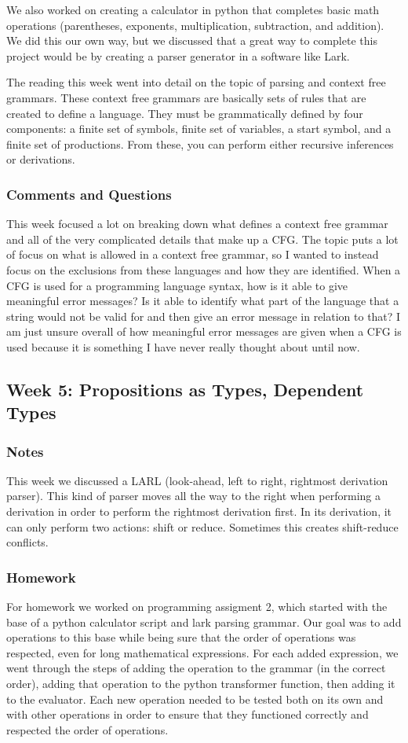\documentclass{article}
\theoremstyle{theorem}
\theoremstyle{definition}
\theoremstyle{remark}
\begin{document}
We also worked on creating a calculator in python that completes basic math 
operations (parentheses, exponents, multiplication, subtraction, and addition). 
We did this our own way, but we discussed that a great way to complete this project would be 
by creating a parser generator in a software like Lark. 

The reading this week went into detail on the topic of parsing and context free grammars. These context 
free grammars are basically sets of rules that are created to define a language. They must be grammatically 
defined by four components: a finite set of symbols, finite set of variables, a start symbol, and a finite set of
productions. From these, you can perform either recursive inferences or derivations. 
\subsubsection*{Comments and Questions}
This week focused a lot on breaking down what defines a context free grammar and all of the very complicated
details that make up a CFG. The topic puts a lot of focus on what is allowed in a context free grammar, so
I wanted to instead focus on the exclusions from these languages and how they are identified. When a CFG is 
used for a programming language syntax, how is it able to give meaningful error messages? Is it able to 
identify what part of the language that a string would not be valid for and then give an error message in
relation to that? I am just unsure overall of how meaningful error messages are given when a CFG is used
because it is something I have never really thought about until now. 

\subsection{Week 5: Propositions as Types, Dependent Types}
\subsubsection*{Notes}
This week we discussed a LARL (look-ahead, left to right, rightmost derivation parser). This kind of parser
moves all the way to the right when performing a derivation in  order to perform the rightmost derivation first.
In its derivation, it can only perform two actions: shift or reduce. Sometimes this creates shift-reduce conflicts.

\subsubsection*{Homework}
For homework we worked on programming assigment 2, which started with the base of a python calculator script
and lark parsing grammar. Our goal was to add operations to this base while being sure that the order of 
operations was respected, even for long mathematical expressions. For each added expression, we went through the 
steps of adding the operation to the grammar (in the correct order), adding that operation to the python transformer
function, then adding it to the evaluator. Each new operation needed to be tested both on its own and with other
operations in order to ensure that they functioned correctly and respected the order of operations.
\end{document}
